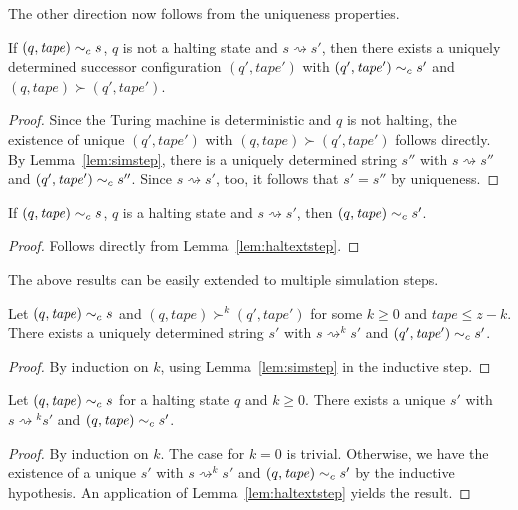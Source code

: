 \documentclass[a4paper,UKenglish,cleveref, autoref]{lipics-v2019}
\newcommand{\strent}{\rightsquigarrow}
\begin{document}
The other direction now follows from the uniqueness properties. 

\begin{lemma}\label{lem:stepinv}
  If $(q, \mathit{tape}) \sim_c{} s$, $q$ is not a halting state and $s \strent{} s'$, then there exists a uniquely determined successor configuration $(q', \mathit{tape}')$ with $(q', \mathit{tape}') \sim_c{} s'$ and $(q, \mathit{tape}) \succ (q', \mathit{tape}')$. 
\end{lemma}
\begin{proof}
  Since the Turing machine is deterministic and $q$ is not halting, the existence of unique $(q', \mathit{tape}')$ with $(q, \mathit{tape}) \succ (q', \mathit{tape}')$ follows directly. By Lemma~\ref{lem:simstep}, there is a uniquely determined string $s''$ with $s \strent{} s''$ and $(q', \mathit{tape}') \sim_c{} s''$. Since $s \strent{} s'$, too, it follows that $s' = s''$ by uniqueness.
\end{proof}

\begin{lemma}\label{lem:haltinv}
  If $(q, \mathit{tape}) \sim_c{} s$, $q$ is a halting state and $s \strent{} s'$, then $(q, \mathit{tape}) \sim_c{} s'$. 
\end{lemma}
\begin{proof}
  Follows directly from Lemma~\ref{lem:haltextstep}. 
\end{proof}

The above results can be easily extended to multiple simulation steps. 
\begin{lemma}\label{lem:mssim}
  Let $(q, \mathit{tape}) \sim_c{} s$ and $(q, \mathit{tape}) \succ^k (q', \mathit{tape}')$ for some $k \ge 0$ and $\mathit{tape} \le z - k$. There exists a uniquely determined string $s'$ with $s \strent^k s'$ and $(q', \mathit{tape}') \sim_c{} s'$. 
\end{lemma}
\begin{proof}
  By induction on $k$, using Lemma~\ref{lem:simstep} in the inductive step.
\end{proof}

\begin{lemma}\label{lem:haltext}
  Let $(q, \mathit{tape}) \sim_c{} s$ for a halting state $q$ and $k \ge 0$. There exists a unique $s'$ with $s \strent{}^k s'$ and $(q, \mathit{tape}) \sim_c{} s'$. 
\end{lemma}
\begin{proof}
  By induction on $k$. The case for $k = 0$ is trivial.
  Otherwise, we have the existence of a unique $s'$ with $s \strent^k s'$ and $(q, \mathit{tape}) \sim_c{} s'$ by the inductive hypothesis. An application of Lemma~\ref{lem:haltextstep} yields the result.
\end{proof}
\end{document}
